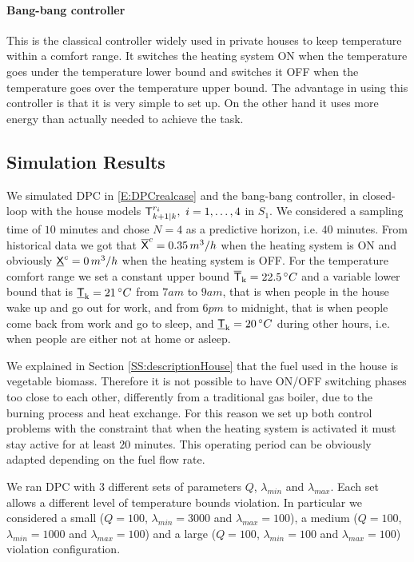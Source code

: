 \paragraph{Bang-bang controller}
This is the classical controller widely used in private houses to keep temperature within a comfort range. It switches the heating system ON when the temperature goes under the temperature lower bound and switches it OFF when the temperature goes over the temperature upper bound. The advantage in using this controller is that it is very simple to set up. On the other hand it uses more energy than actually needed to achieve the task.

\subsection{Simulation Results}\label{SS:simulationResults} We simulated  DPC in \eqref{E:DPCrealcase} and the bang-bang controller, in closed-loop with the house models $\mathsf{T}^{r_i}_{k+1|k},\ i=1,\ldots,4$ in $S_1$. We considered a sampling time of $10$ minutes and chose $N=4$ as a predictive horizon, i.e. $40$ minutes. From historical data we got that $\overline{\mathsf{X}}^c = 0.35 \, m^3/h$ when the heating system is ON and obviously $\underline{\mathsf{X}}^c = 0 \, m^3/h$ when the heating system is OFF. For the temperature comfort range we set a constant upper bound $\overline{\mathsf{T}}_{\mathrm{k}} = 22.5 \, \degree C$ and a variable lower bound that is $\underline{\mathsf{T}}_{\mathrm{k}} = 21 \, \degree C$ from $7am$ to $9am$, that is when people in the house wake up and go out for work, and from $6pm$ to midnight, that is when people come back from work and go to sleep, and $\underline{\mathsf{T}}_{\mathrm{k}} = 20 \, \degree C$ during other hours, i.e. when people are either not at home or asleep.

We explained in Section \ref{SS:descriptionHouse} that the fuel used in the house is vegetable biomass. Therefore it is not possible to have ON/OFF switching phases too close to each other, differently from a traditional gas boiler, due to the burning process and heat exchange. For this reason we set up both control problems with the constraint that when the heating system is activated it must stay active for at least $20$ minutes. This operating period can be obviously adapted depending on the fuel flow rate.

We ran DPC with $3$ different sets of parameters $Q$, $\lambda_{min}$ and $\lambda_{max}$. Each set allows a different level of temperature bounds violation. In particular we considered a small ($Q=100$, $\lambda_{min}=3000$ and $\lambda_{max}=100$), a medium ($Q=100$, $\lambda_{min}=1000$ and $\lambda_{max}=100$) and a large ($Q=100$, $\lambda_{min}=100$ and $\lambda_{max}=100$) violation configuration.
